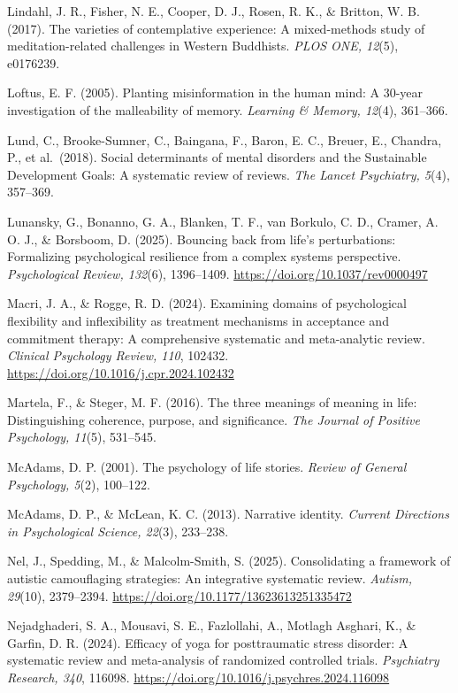 \documentclass[
  11pt,
]{article}
\begin{document}
Lindahl, J. R., Fisher, N. E., Cooper, D. J., Rosen, R. K., \& Britton,
W. B. (2017). The varieties of contemplative experience: A mixed-methods
study of meditation-related challenges in Western Buddhists. \emph{PLOS
ONE, 12}(5), e0176239.

Loftus, E. F. (2005). Planting misinformation in the human mind: A
30-year investigation of the malleability of memory. \emph{Learning \&
Memory, 12}(4), 361--366.

Lund, C., Brooke-Sumner, C., Baingana, F., Baron, E. C., Breuer, E.,
Chandra, P., et al.~(2018). Social determinants of mental disorders and
the Sustainable Development Goals: A systematic review of reviews.
\emph{The Lancet Psychiatry, 5}(4), 357--369.

Lunansky, G., Bonanno, G. A., Blanken, T. F., van Borkulo, C. D.,
Cramer, A. O. J., \& Borsboom, D. (2025). Bouncing back from life's
perturbations: Formalizing psychological resilience from a complex
systems perspective. \emph{Psychological Review, 132}(6), 1396--1409.
\url{https://doi.org/10.1037/rev0000497}

Macri, J. A., \& Rogge, R. D. (2024). Examining domains of psychological
flexibility and inflexibility as treatment mechanisms in acceptance and
commitment therapy: A comprehensive systematic and meta-analytic review.
\emph{Clinical Psychology Review, 110}, 102432.
\url{https://doi.org/10.1016/j.cpr.2024.102432}

Martela, F., \& Steger, M. F. (2016). The three meanings of meaning in
life: Distinguishing coherence, purpose, and significance. \emph{The
Journal of Positive Psychology, 11}(5), 531--545.

McAdams, D. P. (2001). The psychology of life stories. \emph{Review of
General Psychology, 5}(2), 100--122.

McAdams, D. P., \& McLean, K. C. (2013). Narrative identity.
\emph{Current Directions in Psychological Science, 22}(3), 233--238.

Nel, J., Spedding, M., \& Malcolm-Smith, S. (2025). Consolidating a
framework of autistic camouflaging strategies: An integrative systematic
review. \emph{Autism, 29}(10), 2379--2394.
\url{https://doi.org/10.1177/13623613251335472}

Nejadghaderi, S. A., Mousavi, S. E., Fazlollahi, A., Motlagh Asghari,
K., \& Garfin, D. R. (2024). Efficacy of yoga for posttraumatic stress
disorder: A systematic review and meta-analysis of randomized controlled
trials. \emph{Psychiatry Research, 340}, 116098.
\url{https://doi.org/10.1016/j.psychres.2024.116098}
\end{document}
